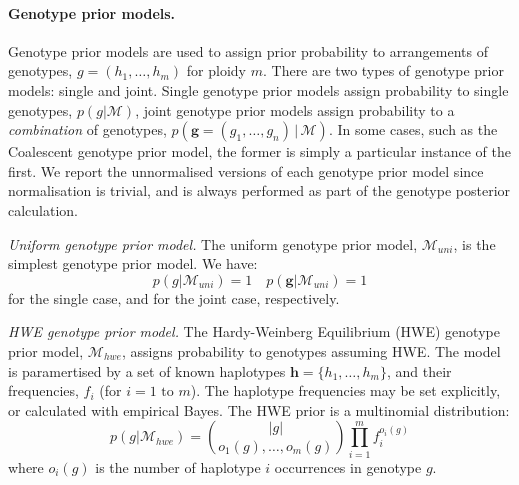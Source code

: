 \documentclass[notitlepage, twocolumn, 10pt]{article}
\begin{document}
\paragraph*{Genotype prior models.} Genotype prior models are used to assign prior probability to arrangements of genotypes, $g = (h_1, \dots, h_m)$ for ploidy $m$. There are two types of genotype prior models: single and joint. Single genotype prior models assign probability to single genotypes, $p(g | \mathcal{M})$, joint genotype prior models assign probability to a \emph{combination} of genotypes, $p(\boldsymbol{g} = (g_1, \dots, g_n) \, | \, \mathcal{M})$. In some cases, such as the Coalescent genotype prior model, the former is simply a particular instance of the first. We report the unnormalised versions of each genotype prior model since normalisation is trivial, and is always performed as part of the genotype posterior calculation.

\vspace{3mm}
\noindent\emph{Uniform genotype prior model.} The uniform genotype prior model, $\mathcal{M}_{uni}$, is the simplest genotype prior model. We have:
\begin{equation*}
    p(g | \mathcal{M}_{uni}) = 1 \quad p(\boldsymbol{g} | \mathcal{M}_{uni}) = 1
\end{equation*}
for the single case, and for the joint case, respectively.

\vspace{3mm}
\noindent\emph{HWE genotype prior model.} The Hardy-Weinberg Equilibrium (HWE) genotype prior model, $\mathcal{M}_{hwe}$, assigns probability to genotypes assuming HWE. The model is paramertised by a set of known haplotypes $\boldsymbol{h} = \{h_1, \dots, h_m\}$, and their frequencies, $f_i$ (for $i = 1\text{ to }m$). The haplotype frequencies may be set explicitly, or calculated with empirical Bayes. The HWE prior is a multinomial distribution:
\begin{equation*}
    p(g | \mathcal{M}_{hwe}) = \binom{|g|}{o_1(g), \dots, o_m(g)} \prod_{i=1}^m f_i^{o_i(g)}
\end{equation*}
where $o_i(g)$ is the number of haplotype $i$ occurrences in genotype $g$.
\end{document}
